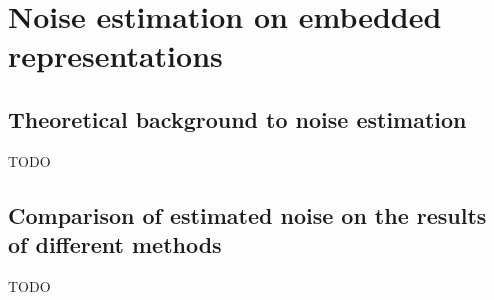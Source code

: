 \chapter{Noise estimation on embedded representations}
\label{sec:Noise}

\section{Theoretical background to noise estimation}
TODO


\section{Comparison of estimated noise on the results of different methods}
TODO
